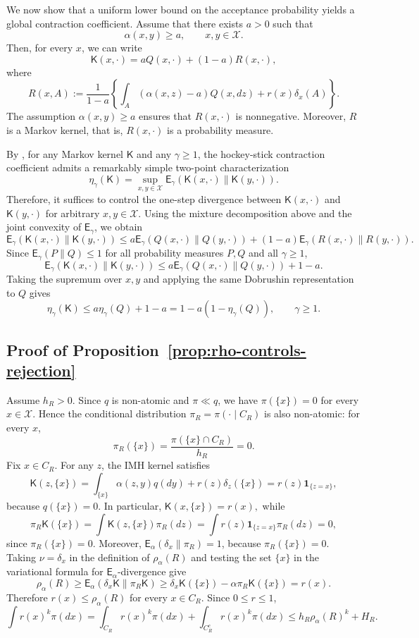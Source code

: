 \documentclass[10pt, journal]{IEEEtran}
\newcommand{\sK}{\mathsf{K}}
\begin{document}
We now show that a uniform lower bound on the acceptance probability yields a global contraction coefficient. Assume that there exists $a>0$ such that $$\alpha(x,y)\ge a,\qquad x,y\in\mathcal X.$$ Then, for every $x$, we can write  $$\sK(x,\cdot)=aQ(x,\cdot)+(1-a)R(x,\cdot),$$ where $$R(x,A):=\frac{1}{1-a}\left\{\int_A(\alpha(x,z)-a)Q(x,dz)+r(x)\delta_x(A)\right\}.$$ The assumption $\alpha(x, y)\ge a$ ensures that $R(x,\cdot)$ is nonnegative. Moreover, $R$ is a Markov kernel, that is, $R(x, \cdot)$ is a probability measure.  

By \cite[Theorem~2]{asoodeh2020contraction}, for any Markov kernel $\sK$ and any $\gamma\ge1$, the hockey-stick contraction coefficient admits a remarkably simple two-point characterization  $$\eta_\gamma(\sK)=\sup_{x,y\in\mathcal X}\mathsf E_\gamma(\sK(x,\cdot)\|\sK(y,\cdot)).$$ Therefore, it suffices to control the one-step divergence between $\sK(x,\cdot)$ and $\sK(y,\cdot)$ for arbitrary $x,y\in\mathcal X$. Using the mixture decomposition above and the joint convexity of $\mathsf E_\gamma$, we obtain $$\mathsf E_\gamma(\sK(x,\cdot)\|\sK(y,\cdot))\le a\mathsf E_\gamma(Q(x,\cdot)\|Q(y,\cdot))+(1-a)\mathsf E_\gamma(R(x,\cdot)\|R(y,\cdot)).$$ Since $\mathsf E_\gamma(P\|Q)\le1$ for all probability measures $P,Q$ and all $\gamma\ge1$, $$\mathsf E_\gamma(\sK(x,\cdot)\|\sK(y,\cdot))\le a\mathsf E_\gamma(Q(x,\cdot)\|Q(y,\cdot))+1-a.$$ Taking the supremum over $x,y$ and applying the same Dobrushin representation to $Q$ gives $$\eta_\gamma(\sK)\le a\eta_\gamma(Q)+1-a=1-a(1-\eta_\gamma(Q)),\qquad \gamma\ge1.$$





\subsection{Proof of Proposition~\ref{prop:rho-controls-rejection}}\label{app:rejectionUB}
Assume $h_R>0$. Since $q$ is non-atomic and $\pi\ll q$, we have $\pi(\{x\})=0$ for every $x\in\mathcal X$. Hence the conditional distribution $\pi_R=\pi(\cdot\mid C_R)$ is also non-atomic: for every $x$,
$$\pi_R(\{x\})=\frac{\pi(\{x\}\cap C_R)}{h_R}=0.$$
Fix $x\in C_R$. For any $z$, the IMH kernel satisfies
$$\sK(z,\{x\})=\int_{\{x\}}\alpha(z,y)q(dy)+r(z)\delta_z(\{x\})=r(z)\mathbf 1_{\{z=x\}},$$
because $q(\{x\})=0$. In particular, $\sK(x,\{x\})=r(x),$
while
$$\pi_R\sK(\{x\})=\int \sK(z,\{x\})\pi_R(dz)=\int r(z)\mathbf 1_{\{z=x\}}\pi_R(dz)=0,$$
since $\pi_R(\{x\})=0$. Moreover, $\mathsf E_\alpha(\delta_x\|\pi_R)=1$, because $\pi_R(\{x\})=0$. Taking $\nu=\delta_x$ in the definition of $\rho_\alpha(R)$ and testing the set $\{x\}$ in the variational formula for $\mathsf E_\alpha$-divergence give
$$\rho_\alpha(R)\ge \mathsf E_\alpha(\delta_x\sK\|\pi_R\sK)\ge \delta_x\sK(\{x\})-\alpha\pi_R\sK(\{x\})=r(x).$$
Therefore $r(x)\le\rho_\alpha(R)$ for every $x\in C_R$. Since $0\le r\le1$,
$$\int r(x)^k\pi(dx)=\int_{C_R}r(x)^k\pi(dx)+\int_{C_R^c}r(x)^k\pi(dx)\le h_R\rho_\alpha(R)^k+H_R.$$
\end{document}
